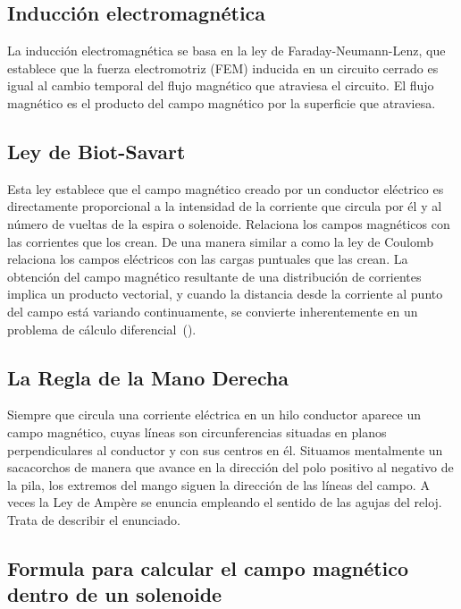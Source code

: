 \documentclass[twocolumn, 12pt]{article}
\begin{document}
\subsection*{Inducción electromagnética}

La inducción electromagnética se basa en la ley de
Faraday-Neumann-Lenz, que establece que la fuerza
electromotriz (FEM) inducida en un circuito cerrado es
igual al cambio temporal del flujo magnético que atraviesa
el circuito. El flujo magnético es el producto del campo
magnético por la superficie que atraviesa.

\subsection*{Ley de Biot-Savart}

Esta ley establece que el campo magnético creado por un
conductor eléctrico es directamente proporcional a la
intensidad de la corriente que circula por él y al número
de vueltas de la espira o solenoide. Relaciona los campos
magnéticos con las corrientes que los crean. De una manera
similar a como la ley de Coulomb relaciona los campos
eléctricos con las cargas puntuales que las crean. La
obtención del campo magnético resultante de una
distribución de corrientes implica un producto vectorial, y
cuando la distancia desde la corriente al punto del campo
está variando continuamente, se convierte inherentemente en
un problema de cálculo diferencial~(\textcite{biot-savart-law}).

\subsection*{La Regla de la Mano Derecha}

Siempre que circula una corriente eléctrica en un hilo
conductor aparece un campo magnético, cuyas líneas son
circunferencias situadas en planos perpendiculares al
conductor y con sus centros en él. Situamos mentalmente un
sacacorchos de manera que avance en la dirección del polo
positivo al negativo de la pila, los extremos del mango
siguen la dirección de las líneas del campo. A veces la Ley
de Ampère se enuncia empleando el sentido de las agujas del
reloj. Trata de describir el enunciado.

\subsection*{Formula para calcular el campo magnético dentro de un solenoide}
\end{document}
